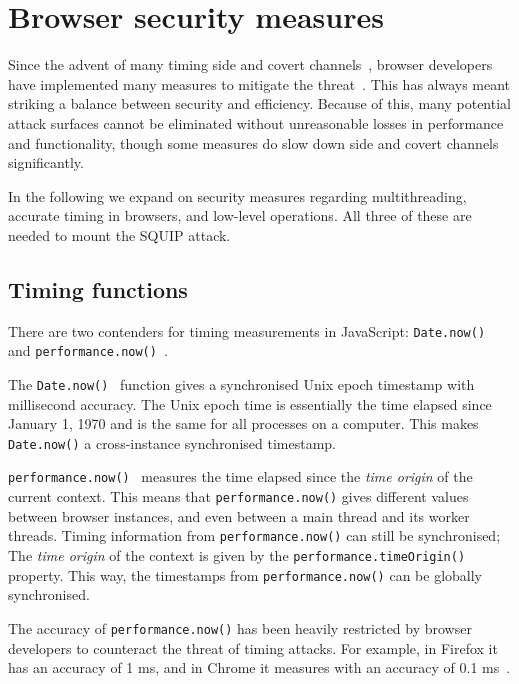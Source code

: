 \documentclass[11pt,
  titlepage=false,
  parskip=half,      %
]{scrreprt}
\begin{document}
\section{Browser security measures}
\label{sec:browsersecurity}
Since the advent of many timing side and covert channels~\cite{noack2018exploiting, Rokicki2022webport, gruss2016rowhammer, 185126},
browser developers have implemented many measures to mitigate the threat~\cite{shusterman2021prime, performancenow, performancenowchrome, schwarz2018javascript}.
This has always meant striking a balance between security and efficiency.
Because of this, many potential attack surfaces cannot be eliminated without unreasonable losses in performance and functionality,
though some measures do slow down side and covert channels significantly.

In the following we expand on security measures regarding multithreading, accurate timing in browsers, and low-level operations.
All three of these are needed to mount the SQUIP attack.


\subsection{Timing functions}\label{subsec:timingjs}
There are two contenders for timing measurements in JavaScript: \texttt{Date.now()}~\cite{datenow} and \texttt{performance.now()}~\cite{performancenow}.

The \texttt{Date.now()}~\cite{datenow} function gives a synchronised Unix epoch timestamp with millisecond accuracy.
The Unix epoch time is essentially the time elapsed since January 1, 1970 and is the same for all processes on a computer.
This makes \texttt{Date.now()} a cross-instance synchronised timestamp.

\texttt{performance.now()}~\cite{performancenow} measures the time elapsed since the \textit{time origin} of the current context.
This means that \texttt{performance.now()} gives different values between browser instances, and even between a main thread and its worker threads.
Timing information from \texttt{performance.now()} can still be synchronised;
The \textit{time origin} of the context is given by the \texttt{performance.timeOrigin()}~\cite{performancetimeorigin} property.
This way, the timestamps from \texttt{performance.now()} can be globally synchronised.

The accuracy of \texttt{performance.now()} has been heavily restricted by browser developers to counteract the threat of timing attacks.
For example, in Firefox it has an accuracy of 1 ms, and in Chrome it measures with an accuracy of 0.1 ms~\cite{performancenow, performancenowchrome}.
\end{document}
